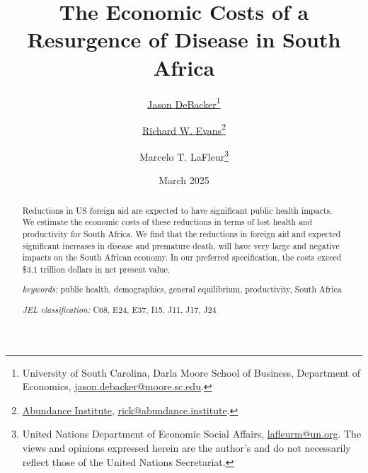 \documentclass[letterpaper,12pt]{article}
\theoremstyle{definition}
\begin{document}
\begin{titlepage}
\title{The Economic Costs of a Resurgence of Disease in South Africa}
\date{March 2025}
\author{\href{http://jasondebacker.com/}{Jason DeBacker}\thanks{University of South Carolina, Darla Moore School of Business, Department of Economics, \href{mailto:jason.debacker@moore.sc.edu}{jason.debacker@moore.sc.edu}.}\and \href{https://sites.google.com/site/rickecon}{Richard W. Evans}\thanks{\href{https://abundance.institute/}{Abundance Institute}, \href{mailto:rick@abundance.institute}{rick@abundance.institute}.}\and {Marcelo T. LaFleur}\thanks{{United Nations Department of Economic Social Affairs}, \href{mailto:lafleurm@un.org}{lafleurm@un.org}. The views and opinions expressed herein are the author's and do not necessarily reflect those of the United Nations Secretariat.}}
\maketitle
\vspace{-2mm}
\begin{abstract}
\small{Reductions in US foreign aid are expected to have significant public health impacts.  We estimate the economic costs of these reductions in terms of lost health and productivity for South Africa.  We find that the reductions in foreign aid and expected significant increases in disease and premature death, will have very large and negative impacts on the South African economy.  In our preferred specification, the costs exceed \$3.1 trillion dollars in net present value.}

\vspace{10mm}

\noindent\textit{keywords:}\: public health, demographics, general equilibrium, productivity, South Africa

\vspace{10mm}

\noindent\textit{JEL classification:} C68, E24, E37, I15, J11, J17, J24


\end{abstract}
\thispagestyle{empty}
\end{titlepage}
\end{document}
